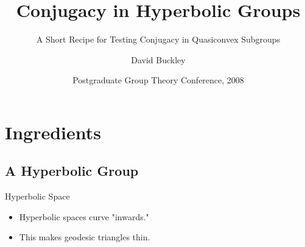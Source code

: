 \documentclass{beamer}
\title{Conjugacy in Hyperbolic Groups}
\subtitle
{A Short Recipe for Testing Conjugacy in Quasiconvex Subgroups}
\author{David Buckley}
\institute[University of Warwick]{
  Mathematics Department\\
  University of Warwick
}
\date[PGTC 2008] %
{Postgraduate Group Theory Conference, 2008}
\begin{document}
\begin{frame}
  \titlepage
\end{frame}






\section{Ingredients}

\subsection{A Hyperbolic Group}

\begin{frame}{Hyperbolic Space}

  \begin{itemize}
  	\item Hyperbolic spaces curve "inwards."
	\item This makes geodesic triangles thin.



  \end{itemize}

\end{frame}
\end{document}
